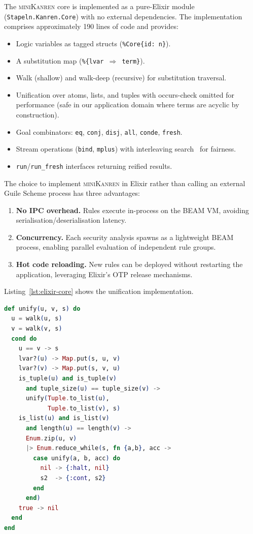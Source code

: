 \documentclass[11pt,twocolumn]{article}
\newcommand{\minikanren}{\textsc{miniKanren}\xspace}
\begin{document}
The \minikanren core is implemented as a pure-Elixir module
(\texttt{Stapeln.Kanren.Core}) with no external dependencies. The
implementation comprises approximately 190 lines of code and provides:

\begin{itemize}[leftmargin=*]
\item Logic variables as tagged structs (\texttt{\%Core\{id: n\}}).
\item A substitution map (\texttt{\%\{lvar $\Rightarrow$ term\}}).
\item Walk (shallow) and walk-deep (recursive) for substitution
      traversal.
\item Unification over atoms, lists, and tuples with occurs-check
      omitted for performance (safe in our application domain where
      terms are acyclic by construction).
\item Goal combinators: \texttt{eq}, \texttt{conj}, \texttt{disj},
      \texttt{all}, \texttt{conde}, \texttt{fresh}.
\item Stream operations (\texttt{bind}, \texttt{mplus}) with
      interleaving search~\cite{byrd2010} for fairness.
\item \texttt{run}/\texttt{run\_fresh} interfaces returning reified
      results.
\end{itemize}

The choice to implement \minikanren in Elixir rather than calling
an external Guile Scheme process has three advantages:

\begin{enumerate}[leftmargin=*]
\item \textbf{No IPC overhead.} Rules execute in-process on the
      BEAM VM, avoiding serialisation/deserialisation latency.
\item \textbf{Concurrency.} Each security analysis spawns as a
      lightweight BEAM process, enabling parallel evaluation of
      independent rule groups.
\item \textbf{Hot code reloading.} New rules can be deployed without
      restarting the application, leveraging Elixir's OTP release
      mechanisms.
\end{enumerate}

Listing~\ref{lst:elixir-core} shows the unification implementation.

\begin{lstlisting}[language=Elixir,caption={Unification in the Elixir
miniKanren core.},label=lst:elixir-core]
def unify(u, v, s) do
  u = walk(u, s)
  v = walk(v, s)
  cond do
    u == v -> s
    lvar?(u) -> Map.put(s, u, v)
    lvar?(v) -> Map.put(s, v, u)
    is_tuple(u) and is_tuple(v)
      and tuple_size(u) == tuple_size(v) ->
      unify(Tuple.to_list(u),
            Tuple.to_list(v), s)
    is_list(u) and is_list(v)
      and length(u) == length(v) ->
      Enum.zip(u, v)
      |> Enum.reduce_while(s, fn {a,b}, acc ->
        case unify(a, b, acc) do
          nil -> {:halt, nil}
          s2  -> {:cont, s2}
        end
      end)
    true -> nil
  end
end
\end{lstlisting}
\end{document}
